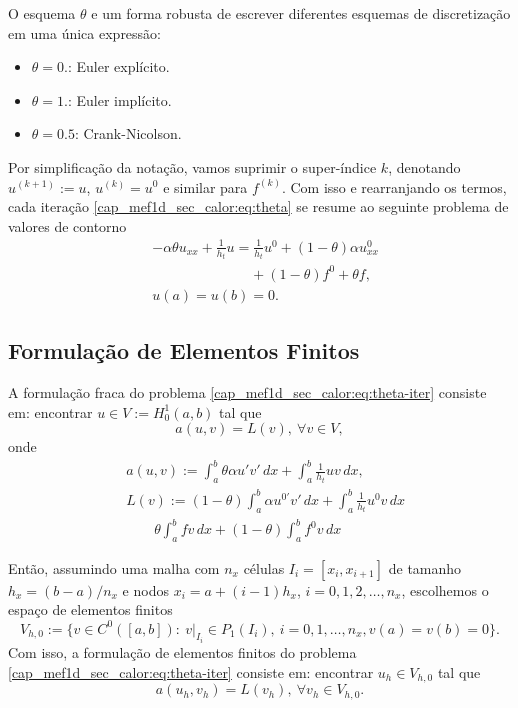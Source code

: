 \begin{obs}
  O esquema $\theta$ e um forma robusta de escrever diferentes esquemas de discretização em uma única expressão:
  \begin{itemize}
    \item $\theta = 0.$: Euler explícito.
    \item $\theta = 1.$: Euler implícito.
    \item $\theta = 0.5$: Crank-Nicolson.
  \end{itemize}
\end{obs}

Por simplificação da notação, vamos suprimir o super-índice $k$, denotando $u^{(k+1)} := u$, $u^{(k)} = u^0$ e similar para $f^{(k)}$. Com isso e rearranjando os termos, cada iteração \eqref{cap_mef1d_sec_calor:eq:theta} se resume ao seguinte problema de valores de contorno
\begin{subequations}\label{cap_mef1d_sec_calor:eq:theta-iter}
  \begin{align}
    &-\alpha\theta u_{xx} + \frac{1}{h_t}u = \frac{1}{h_t}u^0 + (1-\theta)\alpha u^0_{xx} \nonumber\\
    &\qquad\qquad\qquad\quad + (1-\theta)f^0 + \theta f,\\
    &u(a) = u(b) = 0.
  \end{align}
\end{subequations}

\subsection{Formulação de Elementos Finitos}

A formulação fraca do problema \eqref{cap_mef1d_sec_calor:eq:theta-iter} consiste em: encontrar $u\in V := H^1_0(a, b)$ tal que
\begin{equation}
  a(u, v) = L(v), ~\forall v\in V,
\end{equation}
onde
\begin{align}
  &a(u, v) := \int_a^b \theta\alpha u'v'\,dx + \int_a^b \frac{1}{h_t}uv\,dx,\\
  &L(v) := (1-\theta)\int_a^b \alpha u^{0'}v'\,dx + \int_a^b \frac{1}{h_t}u^0v\,dx\nonumber\\
  &\qquad \theta\int_a^b fv\,dx + (1-\theta)\int_a^b f^0v\,dx
\end{align}

Então, assumindo uma malha com $n_x$ células $I_i = [x_i, x_{i+1}]$ de tamanho $h_x = (b-a)/n_x$ e nodos $x_i = a + (i-1)h_x$, $i = 0, 1, 2, \dotsc, n_x$, escolhemos o espaço de elementos finitos
\begin{equation}
  V_{h,0} := \{v\in C^0([a,b]): ~v|_{I_i}\in P_1(I_i), ~i=0,1,\dotsc,n_x, v(a)=v(b)=0\}.
\end{equation}
Com isso, a formulação de elementos finitos do problema \eqref{cap_mef1d_sec_calor:eq:theta-iter} consiste em: encontrar $u_h\in V_{h,0}$ tal que
\begin{equation}
  a(u_h, v_h) = L(v_h), ~\forall v_h\in V_{h,0}.
\end{equation}

